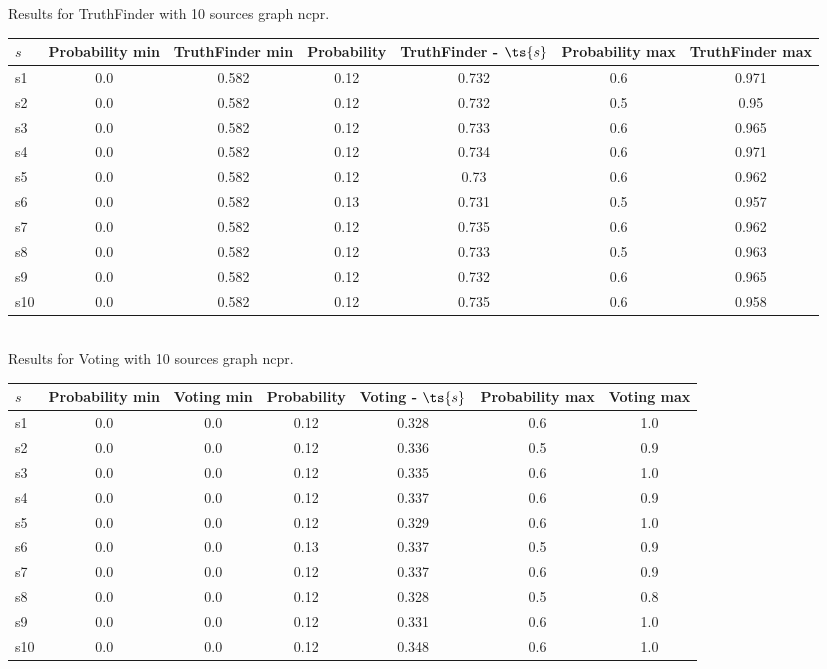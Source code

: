 \documentclass{article}
\begin{document}
\noindent Results for TruthFinder with 10 sources graph ncpr.

\noindent\begin{tabular}{|l|c|c|c|c|c|c|}
\hline
$s$& Probability min & TruthFinder min & Probability & TruthFinder - $\ts{s}$ & Probability max & TruthFinder max\\
\hline
s1 &0.0 & 0.582 & 0.12 & 0.732 & 0.6 & 0.971\\
\hline
s2 &0.0 & 0.582 & 0.12 & 0.732 & 0.5 & 0.95\\
\hline
s3 &0.0 & 0.582 & 0.12 & 0.733 & 0.6 & 0.965\\
\hline
s4 &0.0 & 0.582 & 0.12 & 0.734 & 0.6 & 0.971\\
\hline
s5 &0.0 & 0.582 & 0.12 & 0.73 & 0.6 & 0.962\\
\hline
s6 &0.0 & 0.582 & 0.13 & 0.731 & 0.5 & 0.957\\
\hline
s7 &0.0 & 0.582 & 0.12 & 0.735 & 0.6 & 0.962\\
\hline
s8 &0.0 & 0.582 & 0.12 & 0.733 & 0.5 & 0.963\\
\hline
s9 &0.0 & 0.582 & 0.12 & 0.732 & 0.6 & 0.965\\
\hline
s10 &0.0 & 0.582 & 0.12 & 0.735 & 0.6 & 0.958\\
\hline
\end{tabular}\\

\noindent Results for Voting with 10 sources graph ncpr.

\noindent\begin{tabular}{|l|c|c|c|c|c|c|}
\hline
$s$& Probability min & Voting min & Probability & Voting - $\ts{s}$ & Probability max & Voting max\\
\hline
s1 &0.0 & 0.0 & 0.12 & 0.328 & 0.6 & 1.0\\
\hline
s2 &0.0 & 0.0 & 0.12 & 0.336 & 0.5 & 0.9\\
\hline
s3 &0.0 & 0.0 & 0.12 & 0.335 & 0.6 & 1.0\\
\hline
s4 &0.0 & 0.0 & 0.12 & 0.337 & 0.6 & 0.9\\
\hline
s5 &0.0 & 0.0 & 0.12 & 0.329 & 0.6 & 1.0\\
\hline
s6 &0.0 & 0.0 & 0.13 & 0.337 & 0.5 & 0.9\\
\hline
s7 &0.0 & 0.0 & 0.12 & 0.337 & 0.6 & 0.9\\
\hline
s8 &0.0 & 0.0 & 0.12 & 0.328 & 0.5 & 0.8\\
\hline
s9 &0.0 & 0.0 & 0.12 & 0.331 & 0.6 & 1.0\\
\hline
s10 &0.0 & 0.0 & 0.12 & 0.348 & 0.6 & 1.0\\
\hline
\end{tabular}\\
\end{document}
